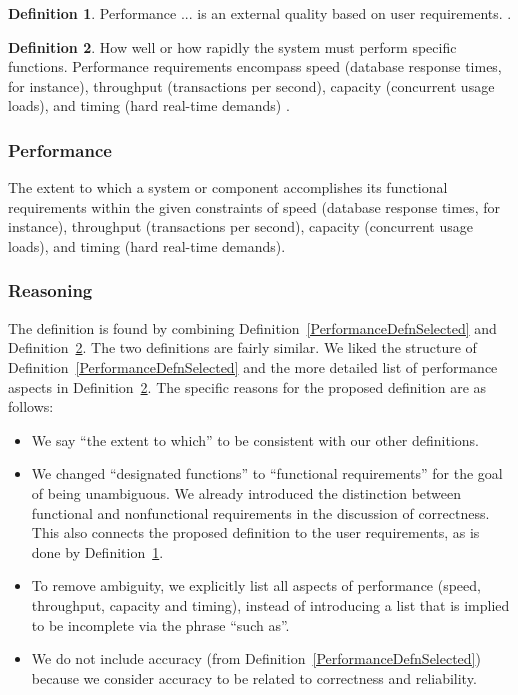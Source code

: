\documentclass[letterpaper, cleveref]{lipics-v2019}
\theoremstyle{definition}
\newtheorem{defn}{Definition}
\begin{document}
\begin{defn} \label{PerformanceGhezzieEtAl2003}
	Performance ... is an external quality based on user requirements.
  \citep[p.\ 20]{GhezziEtAl2003}.
\end{defn}

\begin{defn} \label{PerformanceDefnSelected2} How well or how rapidly the system
	must perform specific functions. Performance requirements encompass speed
	(database response times, for instance), throughput (transactions per second),
	capacity (concurrent usage loads), and timing (hard real-time demands)
	\citep{wiegers2003softreq}.
\end{defn}

\begin{mybox}
\subsubsection*{Performance}
The extent to which a system or component accomplishes its functional
requirements within the given constraints of speed (database response times,
for instance), throughput (transactions per second), capacity (concurrent usage
loads), and timing (hard real-time demands).
\end{mybox}

\subsubsection*{Reasoning}

The definition is found by combining Definition~\ref{PerformanceDefnSelected}
and Definition~\ref{PerformanceDefnSelected2}.  The two definitions are fairly
similar.  We liked the structure of Definition~\ref{PerformanceDefnSelected} and
the more detailed list of performance aspects in
Definition~\ref{PerformanceDefnSelected2}.  The specific reasons for the
proposed definition are as follows:

\begin{itemize}
  \item We say ``the extent to which'' to be consistent with our other
  definitions.
  \item We changed ``designated functions'' to ``functional requirements'' for
  the goal of being unambiguous.  We already introduced the distinction between
  functional and nonfunctional requirements in the discussion of correctness.
  This also connects the proposed definition to the user requirements, as is
  done by Definition~\ref{PerformanceGhezzieEtAl2003}.
  \item To remove ambiguity, we explicitly list all aspects of performance
  (speed, throughput, capacity and timing), instead of introducing a list that
  is implied to be incomplete via the phrase ``such as''.
  \item We do not include accuracy (from
  Definition~\ref{PerformanceDefnSelected}) because we consider accuracy to be
  related to correctness and reliability.
\end{itemize}
\end{document}
